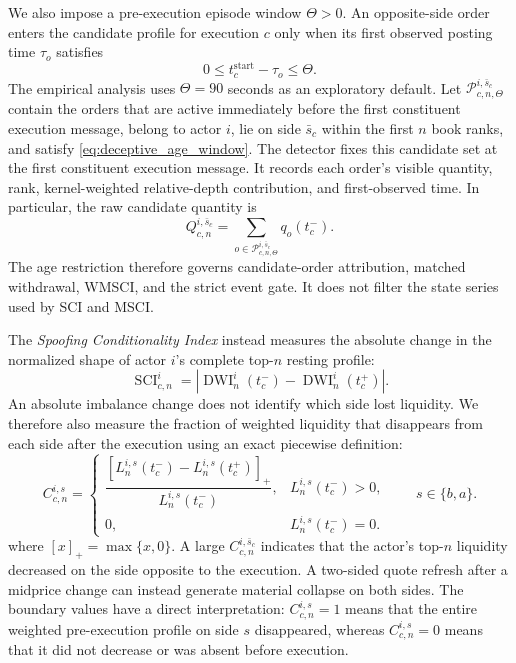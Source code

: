 \documentclass[11pt]{article}
\begin{document}
We also impose a pre-execution episode window $\Theta>0$. An opposite-side order enters the candidate profile for execution
$c$ only when its first observed posting time $\tau_o$ satisfies
\begin{equation}
    0 \leq t_c^{\mathrm{start}}-\tau_o \leq \Theta .
    \label{eq:deceptive_age_window}
\end{equation}
The empirical analysis uses $\Theta=90$ seconds as an exploratory default. Let
$\mathcal{P}^{i,\bar{s}_c}_{c,n,\Theta}$ contain the orders that are active immediately before the first constituent execution message, belong
to actor $i$, lie on side $\bar{s}_c$ within the first $n$ book ranks, and satisfy
\cref{eq:deceptive_age_window}. The detector fixes this candidate set at the first constituent execution message. It records each order's
visible quantity, rank, kernel-weighted relative-depth contribution, and first-observed time. In particular, the raw
candidate quantity is
\begin{equation}
    Q^{i,\bar{s}_c}_{c,n}
    =
    \sum_{o\in\mathcal{P}^{i,\bar{s}_c}_{c,n,\Theta}} q_o(t_c^{-}).
    \label{eq:age_conditioned_candidate_quantity}
\end{equation}
The age restriction therefore governs candidate-order attribution, matched withdrawal, WMSCI, and the strict event gate.
It does not filter the state series used by SCI and MSCI.

The \textit{Spoofing Conditionality Index} instead measures the absolute change in the normalized shape of actor $i$'s
complete top-$n$ resting profile:
\begin{equation}
    \operatorname{SCI}^{i}_{c,n}
    =
    \left|
        \operatorname{DWI}^{i}_{n}(t_c^{-})
        -
        \operatorname{DWI}^{i}_{n}(t_c^{+})
    \right|.
    \label{eq:topn_sci}
\end{equation}
An absolute imbalance change does not identify which side lost liquidity. We therefore also measure the fraction of
weighted liquidity that disappears from each side after the execution using an exact piecewise definition:
\begin{equation}
    C^{i,s}_{c,n}
    =\begin{cases}
    \dfrac{
        \left[
            L^{i,s}_{n}(t_c^{-})-L^{i,s}_{n}(t_c^{+})
        \right]_{+}
    }{
        L^{i,s}_{n}(t_c^{-})
    },
    & L^{i,s}_{n}(t_c^{-})>0,\\
    0,
    & L^{i,s}_{n}(t_c^{-})=0.
    \end{cases}
    \qquad s\in\{b,a\}.
    \label{eq:side_collapse}
\end{equation}
where $[x]_{+}=\max\{x,0\}$. A large $C^{i,\bar{s}_c}_{c,n}$ indicates that the actor's top-$n$ liquidity decreased on the
side opposite to the execution. A two-sided quote refresh after a midprice change can instead generate material
collapse on both sides. The boundary values have a direct interpretation:
$C^{i,s}_{c,n}=1$ means that the entire weighted pre-execution profile on side $s$ disappeared, whereas
$C^{i,s}_{c,n}=0$ means that it did not decrease or was absent before execution.
\end{document}
